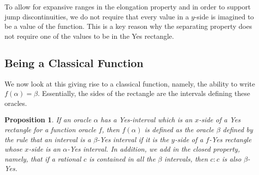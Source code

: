 \documentclass[12pt]{article}
\newtheorem{proposition}{Proposition}
\theoremstyle{remark}
\begin{document}
To allow for expansive ranges in the elongation property and in order to support jump discontinuities, we do not require that every value in a $y$-side is imagined to be a value of the function. This is a key reason why the separating property does not require one of the values to be in the Yes rectangle. 

\subsection{Being a Classical Function}

We now look at this giving rise to a classical function, namely, the ability to write $f(\alpha) = \beta$. Essentially, the sides of the rectangle are the intervals defining these oracles.  

\begin{proposition}
If an oracle $\alpha$ has a Yes-interval which is an $x$-side of a Yes rectangle for a function oracle $f$, then $f(\alpha)$ is defined as the oracle $\beta$ defined by the rule that an interval is a $\beta$-Yes interval if it is the $y$-side of a $f$-Yes rectangle whose $x$-side is an $\alpha$-Yes interval. In addition, we add in the closed property, namely, that if a rational $c$ is contained in all the $\beta$ intervals, then $c:c$ is also $\beta$-Yes.  
\end{proposition}
\end{document}
